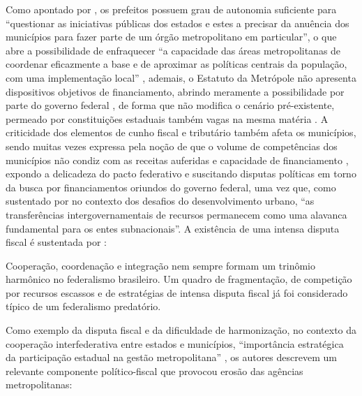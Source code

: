 \documentclass[
article,			%
11pt,				%
oneside,			%
a4paper,			%
english,			%
brazil,				%
sumario=tradicional
]{abntex2}
\begin{document}
	Como apontado por , os prefeitos possuem grau de autonomia suficiente para ``questionar as iniciativas públicas dos estados e estes a precisar da anuência dos municípios para fazer parte de um órgão metropolitano em particular'', o que abre a possibilidade de enfraquecer ``a capacidade das áreas metropolitanas de coordenar eficazmente a base e de aproximar as políticas centrais da população, com uma implementação local'' , ademais, o Estatuto da Metrópole não apresenta dispositivos objetivos de financiamento, abrindo meramente a possibilidade por parte do governo federal \cite[p. 20]{mundial2015a}, de forma que não modifica o cenário pré-existente, permeado por constituições estaduais também vagas na mesma matéria \cite[p. 101]{guia2015a}. A criticidade dos elementos de cunho fiscal e tributário também afeta os municípios, sendo muitas vezes expressa pela noção de que o volume de competências dos municípios não condiz com as receitas auferidas e capacidade de financiamento \cite[p. 19, 74]{cave2014a}, expondo a delicadeza do pacto federativo e suscitando disputas políticas em torno da busca por financiamentos oriundos do governo federal, uma vez que, como sustentado por  no contexto dos desafios do desenvolvimento urbano, ``as transferências intergovernamentais de recursos permanecem como uma alavanca fundamental para os entes subnacionais''. A existência de uma intensa disputa fiscal é sustentada por :
	
	\begin{citacao}
		Cooperação, coordenação e integração nem sempre formam um trinômio harmônico no federalismo brasileiro. Um quadro de fragmentação, de competição por recursos escassos e de estratégias de intensa disputa fiscal já foi considerado típico de um federalismo predatório.
	\end{citacao}

	Como exemplo da disputa fiscal e da dificuldade de harmonização, no contexto da cooperação interfederativa entre estados e municípios, ``importância estratégica da participação estadual na gestão metropolitana'' \cite[p. 103]{guia2015a}, os autores descrevem um relevante componente político-fiscal que provocou erosão das agências metropolitanas:
\end{document}
